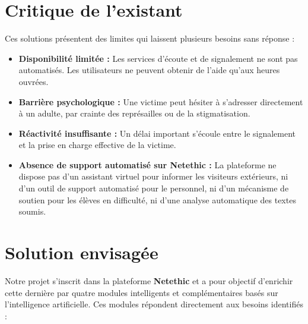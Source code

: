 \section{Critique de l'existant}

Ces solutions présentent des limites qui laissent plusieurs besoins sans réponse :

\begin{itemize}
    \item \textbf{Disponibilité limitée :} Les services d'écoute et de signalement ne sont pas automatisés.
          Les utilisateurs ne peuvent obtenir de l'aide qu'aux heures ouvrées.
    \item \textbf{Barrière psychologique :} Une victime peut hésiter à s'adresser directement à un adulte, par crainte des représailles ou de la stigmatisation.
    \item \textbf{Réactivité insuffisante :} Un délai important s'écoule entre le signalement et la prise en charge effective de la victime.
    \item \textbf{Absence de support automatisé sur Netethic :} La plateforme ne dispose pas d'un assistant virtuel pour informer les visiteurs extérieurs, ni d'un outil de support automatisé pour le personnel, ni d'un mécanisme de soutien pour les élèves en difficulté, ni d'une analyse automatique des textes soumis.
\end{itemize}

\section{Solution envisagée}

Notre projet s'inscrit dans la plateforme \textbf{Netethic} et a pour objectif d'enrichir cette dernière par quatre modules intelligents et complémentaires basés sur l'intelligence artificielle.
Ces modules répondent directement aux besoins identifiés :

